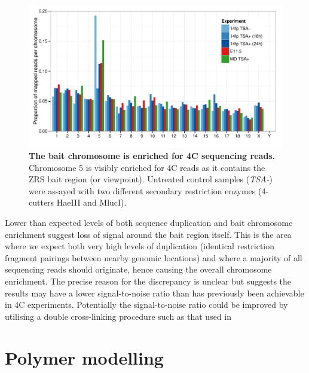 \documentclass[a4paper,11pt,oneside]{book}
\begin{document}
\begin{figure}
\begin{center} 
\includegraphics[width=5.4in]{figs/4c_chromosomes_v2.pdf}
\captionsetup{width=\textwidth} 
\caption[ The bait chromosome is enriched for 4C sequencing reads. ]{ {\bf The bait chromosome is enriched for 4C sequencing reads. }
Chromosome 5 is visibly enriched for 4C reads as it  contains the ZRS bait region (or viewpoint). Untreated control samples (\emph{TSA-}) were assayed with two different secondary restriction enzymes (4-cutters HaeIII and MlucI).
}\label{fig:4cchromosomes}
\end{center} 
\end{figure} 

Lower than expected levels of both sequence duplication and bait chromosome enrichment suggest loss of signal around the bait region itself. This is the area where we expect both very high levels of duplication (identical restriction fragment pairings between nearby genomic locations) and where a majority of all sequencing reads should originate, hence causing the overall chromosome enrichment. The precise reason for the discrepancy is unclear but suggests the results may have a lower signal-to-noise ratio than has previously been achievable in 4C experiments.\cite{Stadhouders2013} Potentially the signal-to-noise ratio could be improved by utilising a double cross-linking procedure such as that used in \citet{Lin2012}

\section{Polymer modelling}
\end{document}

